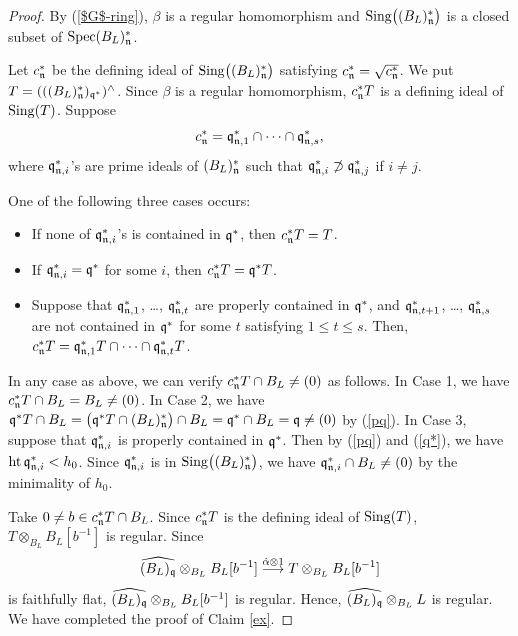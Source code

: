\documentclass[11pt,a4paper]{amsart}
\theoremstyle{definition}
\theoremstyle{remark}
\newcommand{\Spec}{\operatorname{Spec}}
\newcommand{\Ht}{\operatorname{ht}}
\newcommand{\fq}{\frak{q}}
\newcommand{\fn}{\frak{n}}
\begin{document}
\begin{proof}
By (\ref{$G$-ring}), $\beta$ is a regular homomorphism
and ${\rm Sing}\big((B_{L})_{\fn}^*\big)$ is a closed subset of
$\Spec (B_{L})_{\fn}^*$.

Let $c_\fn^*$ be the defining ideal of ${\rm Sing}\big((B_{L})_{\fn}^*\big)$
satisfying $c_\fn^* = \sqrt{c_\fn^*}$.
We put $T = ( ((B_{L})_{\fn}^*)_{\fq^*} )^\wedge$.
Since $\beta$ is a regular homomorphism, $c_\fn^*T$ is a defining ideal of ${\rm Sing}(T)$.
Suppose
\[
c_\fn^* = \fq_{\fn,1}^* \cap \cdots \cap \fq_{\fn,s}^* ,
\]
where $\fq_{\fn, i}^*$'s are prime ideals of $(B_{L})_{\fn}^*$
such that $\fq_{\fn, i}^* \not\supset \fq_{\fn, j}^*$ if $i \neq j$.

One of the following three cases occurs:
\begin{itemize}
\item[Case 1.]
If none of $\fq_{\fn, i}^*$'s is contained in $\fq^*$, then
$c_\fn^*T = T$.
\item[Case 2.]
If $\fq_{\fn, i}^* = \fq^*$ for some $i$, then
$c_\fn^*T = \fq^*T$.
\item[Case 3.]
Suppose that $\fq_{\fn, 1}^*$, \ldots,  $\fq_{\fn, t}^*$ are properly contained in $\fq^*$, and  $\fq_{\fn, t+1}^*$, \ldots,  $\fq_{\fn, s}^*$ are not contained in $\fq^*$
for some $t$ satisfying $1 \le t \le s$.
Then, $c_\fn^*T = \fq_{\fn, 1}^*T \cap \cdots \cap \fq_{\fn, t}^*T$.
\end{itemize}

In any case as above, we can verify $c_\fn^*T \cap B_L \neq (0)$ as follows. In Case 1, we have $c_\fn^*T \cap B_L= B_L \ne (0)$. In Case 2, we have $\fq^*T \cap B_L = \big(\fq^*T \cap (B_L)_\fn^*\big) \cap B_L = \fq^* \cap B_L = \fq \neq (0)$ by (\ref{pq}). In Case 3, suppose that $\fq_{\fn, i}^*$ is properly contained in $\fq^*$. Then by (\ref{pq}) and (\ref{q*}), we have $\Ht \fq_{\fn, i}^* < h_0$. Since $\fq_{\fn, i}^*$ is in ${\rm Sing}\big((B_L)_\fn^*\big)$,  we have $\fq_{\fn, i}^* \cap B_L \neq (0)$ by the minimality of $h_0$.

Take $0 \neq b \in c_\fn^*T \cap B_L$.
Since  $c_\fn^*T$ is the defining ideal of ${\rm Sing}(T)$,
$T \otimes_{B_L} B_L[b^{-1}]$ is regular.
Since 
\[
 \widehat{(B_{L})_\fq} \otimes_{B_L} B_L[b^{-1}] \stackrel{\hat{\alpha}\otimes 1}{\longrightarrow}
T \otimes_{B_L} B_L[b^{-1}]
\]
is faithfully flat,
$\widehat{(B_{L})_\fq} \otimes_{B_L} B_L[b^{-1}]$ is regular.
Hence, $\widehat{(B_{L})_\fq} \otimes_{B_L} L$ is regular.
We have completed the proof of Claim \ref{ex}.

\vspace{2mm}


\end{proof}
\end{document}
